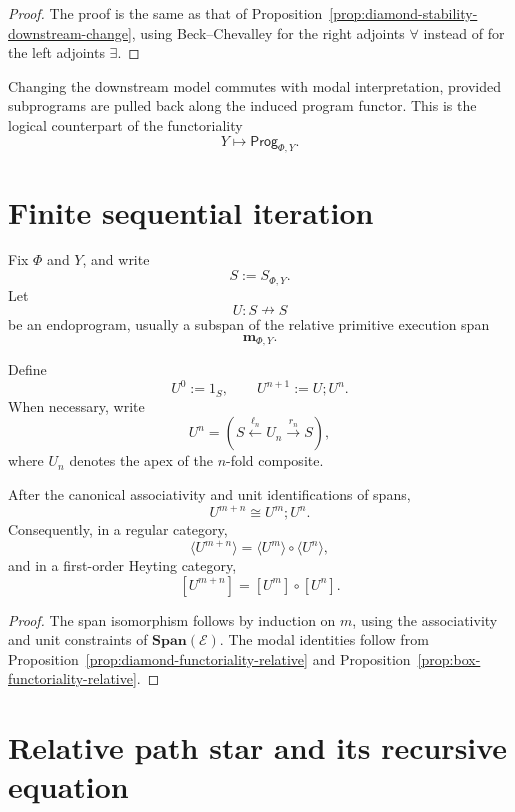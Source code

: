 \begin{proof}
The proof is the same as that of
Proposition~\ref{prop:diamond-stability-downstream-change}, using
Beck--Chevalley for the right adjoints \(\forall\) instead of for the left
adjoints \(\exists\).
\end{proof}

\begin{remark}
\label{rem:modal-stability-interpretation}
Changing the downstream model commutes with modal interpretation, provided
subprograms are pulled back along the induced program functor. This is the
logical counterpart of the functoriality
\[
Y\mapsto \mathsf{Prog}_{\Phi,Y}.
\]
\end{remark}

\section{Finite sequential iteration}
\label{sec:relative-finite-sequential-iteration}

Fix \(\Phi\) and \(Y\), and write
\[
S:=S_{\Phi,Y}.
\]
Let
\[
U:S\nrightarrow S
\]
be an endoprogram, usually a subspan of the relative primitive execution span
\[
\mathbf m_{\Phi,Y}.
\]

Define
\[
U^0:=1_S,
\qquad
U^{n+1}:=U;U^n.
\]
When necessary, write
\[
U^n=
\left(
S\xleftarrow{\ell_n}U_n\xrightarrow{r_n}S
\right),
\]
where \(U_n\) denotes the apex of the \(n\)-fold composite.

\begin{proposition}
\label{prop:relative-finite-sequential-laws}
After the canonical associativity and unit identifications of spans,
\[
U^{m+n}\cong U^m;U^n.
\]
Consequently, in a regular category,
\[
\langle U^{m+n}\rangle
=
\langle U^m\rangle\circ\langle U^n\rangle,
\]
and in a first-order Heyting category,
\[
[U^{m+n}]
=
[U^m]\circ[U^n].
\]
\end{proposition}

\begin{proof}
The span isomorphism follows by induction on \(m\), using the associativity and
unit constraints of \(\mathbf{Span}(\mathcal E)\). The modal identities follow
from Proposition~\ref{prop:diamond-functoriality-relative} and
Proposition~\ref{prop:box-functoriality-relative}.
\end{proof}

\section{Relative path star and its recursive equation}
\label{sec:relative-path-star-recursive-equation}


